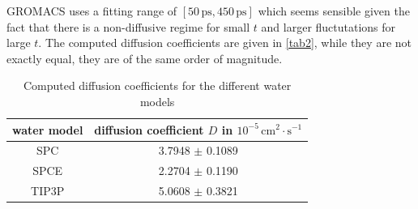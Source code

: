 \documentclass[a4paper,10pt,bibtotoc]{scrartcl}
\begin{document}
\noindent GROMACS uses a fitting range of $\left[50\,\mathrm{ps},450\,\mathrm{ps}\right]$ which seems sensible given the fact that there is a non-diffusive regime for small $t$ and larger fluctutations for large $t$. 
The computed diffusion coefficients are given in \autoref{tab2}, while they are not exactly equal, they are of the same order of magnitude. 

\begin{table}[h]
\centering
\caption{Computed diffusion coefficients for the different water models}
\begin{tabular}{@{}cc@{}}
\toprule
water model & diffusion coefficient $D$ in $10^{-5}\,\mathrm{cm}^2\cdot \mathrm{s}^{-1}$ \\ \midrule
SPC         &          3.7948 $\pm$ 0.1089                 \\
SPCE        &          2.2704 $\pm$ 0.1190            \\
TIP3P       &          5.0608 $\pm$       0.3821    \\ \bottomrule
\end{tabular}
\label{tab2}
\end{table}
\end{document}

